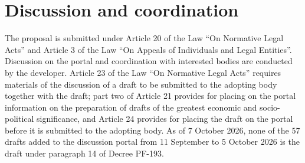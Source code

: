 \documentclass[14pt,a4paper]{extarticle}
\begin{document}
\section{Discussion and coordination}
The proposal is submitted under Article 20 of the Law “On Normative Legal Acts” and Article 3 of the Law “On Appeals of Individuals and Legal Entities”. Discussion on the portal and coordination with interested bodies are conducted by the developer. Article 23 of the Law “On Normative Legal Acts” requires materials of the discussion of a draft to be submitted to the adopting body together with the draft; part two of Article 21 provides for placing on the portal information on the preparation of drafts of the greatest economic and socio-political significance, and Article 24 provides for placing the draft on the portal before it is submitted to the adopting body\cite{orq682}. As of 7 October 2026, none of the 57 drafts added to the discussion portal from 11 September to 5 October 2026 is the draft under paragraph 14 of Decree PF-193\cite{portal}.
\end{document}
